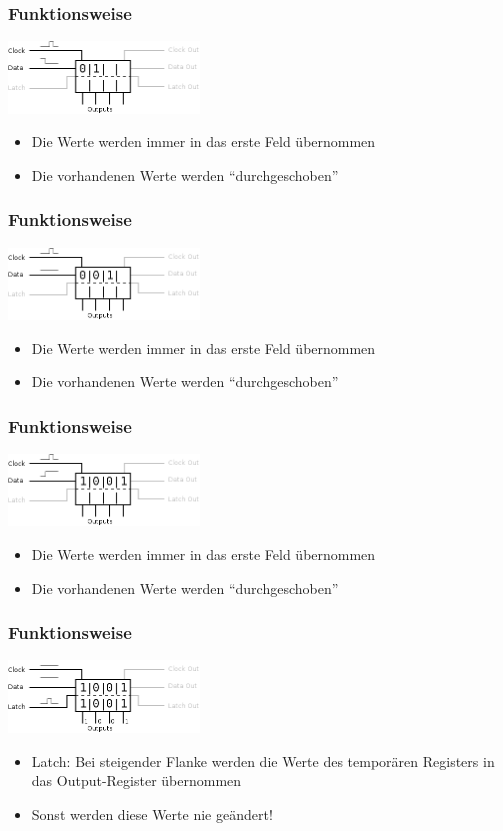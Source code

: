 \documentclass[ngerman,compress]{beamer}
\begin{document}
\begin{frame} [fragile]
	\frametitle{Funktionsweise}
	\includegraphics[width=2in]{03_shift.png}
	\pause
	\begin{itemize}
		\item Die Werte werden immer in das erste Feld übernommen
		\item Die vorhandenen Werte werden ``durchgeschoben''
	\end{itemize}
\end{frame}

\begin{frame} [fragile]
	\frametitle{Funktionsweise}
	\includegraphics[width=2in]{04_shift.png}
	\begin{itemize}
		\item Die Werte werden immer in das erste Feld übernommen
		\item Die vorhandenen Werte werden ``durchgeschoben''
	\end{itemize}
\end{frame}

\begin{frame} [fragile]
	\frametitle{Funktionsweise}
	\includegraphics[width=2in]{05_shift.png}
	\begin{itemize}
		\item Die Werte werden immer in das erste Feld übernommen
		\item Die vorhandenen Werte werden ``durchgeschoben''
	\end{itemize}
\end{frame}

\begin{frame} [fragile]
	\frametitle{Funktionsweise}
	\includegraphics[width=2in]{06_latch.png}
	\pause
	\begin{itemize}
		\item Latch: Bei steigender Flanke werden die Werte des temporären Registers in das
			Output-Register übernommen
		\item Sonst werden diese Werte nie geändert!
	\end{itemize}
\end{frame}
\end{document}

